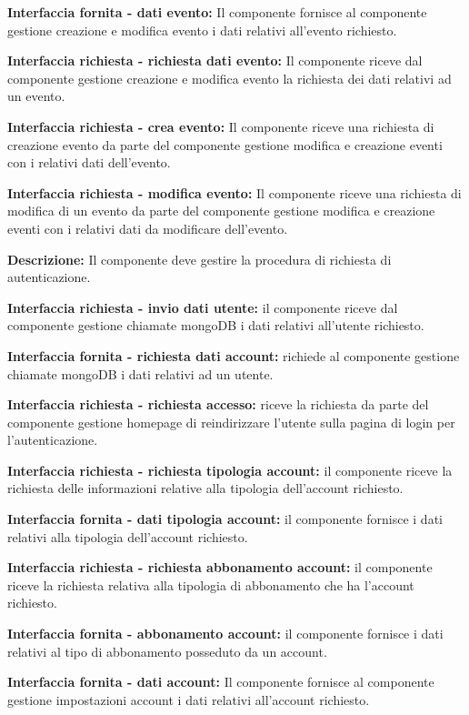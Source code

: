 \begin{listaPersonale}[]{}
    \textbf{Interfaccia fornita - dati evento:} Il componente fornisce al componente gestione creazione e modifica evento i dati relativi all'evento richiesto.

    \textbf{Interfaccia richiesta - richiesta dati evento:} Il componente riceve dal componente gestione creazione e modifica evento la richiesta dei dati relativi ad un evento.

    \textbf{Interfaccia richiesta - crea evento:} Il componente riceve una richiesta di creazione evento da parte del componente gestione modifica e creazione eventi con i relativi dati dell'evento.

    \textbf{Interfaccia richiesta - modifica evento:} Il componente riceve una richiesta di modifica di un evento da parte del componente gestione modifica e creazione eventi con i relativi dati da modificare dell'evento.



    \textbf{Descrizione:}  Il componente deve gestire la procedura di richiesta di autenticazione.

    \textbf{Interfaccia richiesta - invio dati utente:} il componente riceve dal componente gestione chiamate mongoDB i dati relativi all'utente richiesto.

    \textbf{Interfaccia fornita - richiesta dati account:} richiede al componente gestione chiamate mongoDB i dati relativi ad un utente.

    \textbf{Interfaccia richiesta - richiesta accesso:} riceve la richiesta da parte del componente gestione homepage di reindirizzare l'utente sulla pagina di login per l'autenticazione.

    \textbf{Interfaccia richiesta - richiesta tipologia account:} il componente riceve la richiesta delle informazioni relative alla tipologia dell'account richiesto.

    \textbf{Interfaccia fornita - dati tipologia account:} il componente fornisce i dati relativi alla tipologia dell'account richiesto.

    \textbf{Interfaccia richiesta - richiesta abbonamento account:} il componente riceve la richiesta relativa alla tipologia di abbonamento che ha l'account richiesto.

    \textbf{Interfaccia fornita - abbonamento account:} il componente fornisce i dati relativi al tipo di abbonamento posseduto da un account.

    \textbf{Interfaccia fornita - dati account:} Il componente fornisce al componente gestione impostazioni account i dati relativi all'account richiesto.


\end{listaPersonale}
